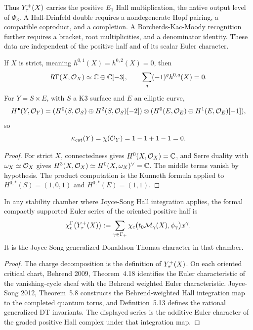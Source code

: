 Thus $Y^{+}_\tau(X)$ carries the positive $E_1$ Hall multiplication,
the native output level of \(\Phi_3\). A Hall-Drinfeld double
requires a nondegenerate Hopf pairing, a compatible coproduct, and a
completion. A Borcherds-Kac-Moody recognition further requires a
bracket, root multiplicities, and a denominator identity. These data
are independent of the positive half and of its scalar Euler character.

\begin{lemma}
\label{lem:compact-cy3-hodge-trace}
If $X$ is strict, meaning $h^{0,1}(X)=h^{0,2}(X)=0$, then
\[
  R\Gamma(X,\mathcal{O}_X)\simeq \mathbb{C}\oplus\mathbb{C}[-3],
  \qquad
  \sum_q(-1)^q h^{0,q}(X)=0.
\]
For $Y=S\times E$, with $S$ a K3 surface and $E$ an elliptic curve,
\[
  H^\bullet(Y,\mathcal{O}_Y)
  =
  (H^0(S,\mathcal{O}_S)\oplus H^2(S,\mathcal{O}_S)[-2])
  \otimes
  (H^0(E,\mathcal{O}_E)\oplus H^1(E,\mathcal{O}_E)[-1]),
\]
so
\[
  \kappa_{\mathrm{cat}}(Y)=\chi(\mathcal{O}_Y)=1-1+1-1=0.
\]
\end{lemma}

\begin{proof}
For strict $X$, connectedness gives $H^0(X,\mathcal{O}_X)=\mathbb{C}$, and Serre
duality with $\omega_X\simeq\mathcal{O}_X$ gives
$H^3(X,\mathcal{O}_X)\simeq H^0(X,\omega_X)^\vee=\mathbb{C}$. The middle terms vanish
by hypothesis. The product computation is the Kunneth formula applied
to $H^{0,*}(S)=(1,0,1)$ and $H^{0,*}(E)=(1,1)$.
\end{proof}

\begin{proposition}
\label{prop:Yplus-JS-character}
In any stability chamber where Joyce-Song Hall integration applies, the
formal compactly supported Euler series of the oriented positive half is
\[
  \chi_c^\Gamma\bigl(Y^{+}_\tau(X)\bigr)
  :=
  \sum_{\gamma\in\Gamma_+}
  \chi_c\bigl(t_0\mathcal{M}_\gamma(X),\phi_\gamma\bigr)x^\gamma.
\]
It is the Joyce-Song generalized Donaldson-Thomas character in that
chamber.
\end{proposition}

\begin{proof}
The charge decomposition is the definition of $Y^{+}_\tau(X)$. On each
oriented critical chart, Behrend 2009, Theorem~4.18 identifies the Euler
characteristic of the vanishing-cycle sheaf with the Behrend weighted
Euler characteristic. Joyce-Song 2012, Theorem~5.8 constructs the
Behrend-weighted Hall integration map to the completed quantum torus,
and Definition~5.13 defines the rational generalized DT invariants. The
displayed series is the additive Euler character of the graded positive
Hall complex under that integration map.
\end{proof}

